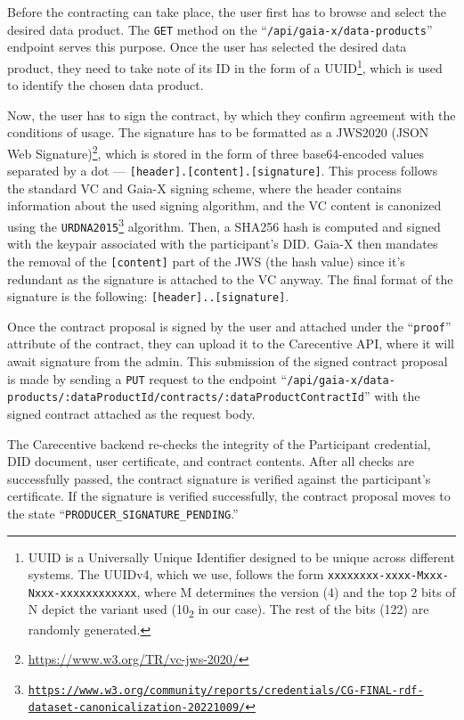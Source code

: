 Before the contracting can take place, the user first has to browse and select the desired data product.
The \texttt{GET} method on the ``\texttt{/api\-/gaia-x\-/data-products}'' endpoint serves this purpose.
Once the user has selected the desired data product, they need to take note of its ID in the form of a UUID\footnote{UUID is a Universally Unique Identifier designed to be unique across different systems. The UUIDv4, which we use, follows the form \texttt{xxxxxxxx-xxxx-Mxxx-Nxxx-xxxxxxxxxxxx}, where M determines the version (4) and the top 2 bits of N depict the variant used (10\textsubscript{2} in our case). The rest of the bits (122) are randomly generated.}, which is used to identify the chosen data product.

Now, the user has to sign the contract, by which they confirm agreement with the conditions of usage.
The signature has to be formatted as a JWS2020 (JSON Web Signature)\footnote{\url{https://www.w3.org/TR/vc-jws-2020/}}, which is stored in the form of three base64-encoded values separated by a dot --- \texttt{[header].[content].[signature]}.
This process follows the standard VC and Gaia-X signing scheme, where the header contains information about the used signing algorithm, and the VC content is canonized using the \texttt{URDNA2015\footnote{\url{https://www.w3.org/community/reports/credentials/CG-FINAL-rdf-dataset-canonicalization-20221009/}}} algorithm.
Then, a SHA256 hash is computed and signed with the keypair associated with the participant's DID.
Gaia-X then mandates the removal of the \texttt{[content]} part of the JWS (the hash value) since it's redundant as the signature is attached to the VC anyway.
The final format of the signature is the following: \texttt{[header]..[signature]}.

Once the contract proposal is signed by the user and attached under the ``\texttt{proof}'' attribute of the contract, they can upload it to the Carecentive API, where it will await signature from the admin.
This submission of the signed contract proposal is made by sending a \texttt{PUT} request to the endpoint ``\texttt{/api\-/gaia-x\-/data-products\-/:dataProductId\-/contracts\-/:dataProduct\-ContractId}'' with the signed contract attached as the request body.

The Carecentive backend re-checks the integrity of the Participant credential, DID document, user certificate, and contract contents.
After all checks are successfully passed, the contract signature is verified against the participant's certificate.
If the signature is verified successfully, the contract proposal moves to the state ``\texttt{PRODUCER\_SIGNATURE\_PENDING}.''

